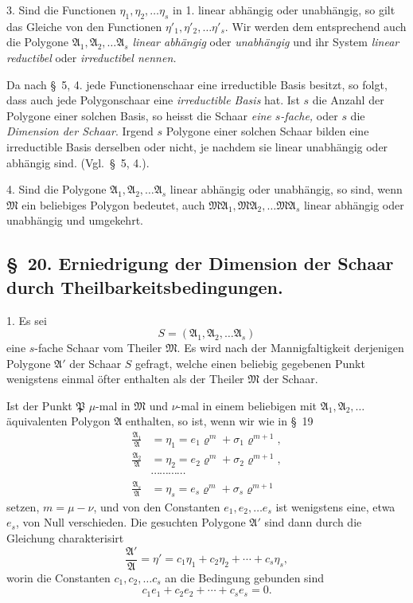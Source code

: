 \documentclass{article}
\begin{document}

3. Sind die Functionen $\eta_{1}, \eta_{2}, \ldots \eta_{s}$ in 1. linear abhängig oder unabhängig, so gilt das Gleiche von den Functionen $\eta'_{1}, \eta'_{2}, \ldots \eta'_{s}$. Wir werden dem entsprechend auch die Polygone $\mathfrak{A}_{1}, \mathfrak{A}_{2}, \ldots \mathfrak{A}_{s}$ \emph{linear abhängig} oder \emph{unabhängig} und ihr System \emph{linear reductibel} oder \emph{irreductibel nennen.}

Da nach §~5, 4. jede Functionenschaar eine irreductible Basis besitzt, so folgt, dass auch jede Polygonschaar eine \emph{irreductible Basis} hat. Ist $s$ die Anzahl der Polygone einer solchen Basis, so heisst die Schaar \emph{eine $s$-fache,} oder $s$ die \emph{Dimension der Schaar}. Irgend $s$ Polygone einer solchen Schaar bilden eine irreductible Basis derselben oder nicht, je nachdem sie linear unabhängig oder abhängig sind. (Vgl.\ §~5, 4.).

4. Sind die Polygone $\mathfrak{A}_{1}, \mathfrak{A}_{2}, \ldots \mathfrak{A}_{s}$ linear abhängig oder unabhängig, so sind, wenn $\mathfrak{M}$ ein beliebiges Polygon bedeutet, auch $\mathfrak{M}\mathfrak{A}_{1}, \mathfrak{M}\mathfrak{A}_{2}, \ldots \mathfrak{M}\mathfrak{A}_{s}$ linear abhängig oder unabhängig und umgekehrt.

\subsection*{§~20. Erniedrigung der Dimension der Schaar durch Theilbarkeitsbedingungen.}

1. Es sei
\[ S = (\mathfrak{A}_{1}, \mathfrak{A}_{2}, \ldots \mathfrak{A}_{s}) \]
eine $s$-fache Schaar vom Theiler $\mathfrak{M}$. Es wird nach der Mannigfaltigkeit derjenigen Polygone $\mathfrak{A}'$ der Schaar $S$ gefragt, welche einen beliebig gegebenen Punkt wenigstens einmal öfter enthalten als der Theiler $\mathfrak{M}$ der Schaar.

Ist der Punkt $\mathfrak{P}$ $\mu$-mal in $\mathfrak{M}$ und $\nu$-mal in einem beliebigen mit $\mathfrak{A}_{1}, \mathfrak{A}_{2}, \ldots$ äquivalenten Polygon $\mathfrak{A}$ enthalten, so ist, wenn wir wie in §~19
\[ \begin{aligned} \frac{\mathfrak{A}_{1}}{\mathfrak{A}} &= \eta_{1} = e_{1}\varrho^{m} + \sigma_{1}\varrho^{m+1}, \\ \frac{\mathfrak{A}_{2}}{\mathfrak{A}} &= \eta_{2} = e_{2}\varrho^{m} + \sigma_{2}\varrho^{m+1}, \\ &\cdots\cdots\cdots\cdots \\ \frac{\mathfrak{A}_{s}}{\mathfrak{A}} &= \eta_{s} = e_{s}\varrho^{m} + \sigma_{s}\varrho^{m+1} \end{aligned} \]
setzen, $m = \mu - \nu$, und von den Constanten $e_{1}, e_{2}, \ldots e_{s}$ ist wenigstens eine, etwa $e_{s}$, von Null verschieden. Die gesuchten Polygone $\mathfrak{A}'$ sind dann durch die Gleichung charakterisirt
\[ \frac{\mathfrak{A}'}{\mathfrak{A}} = \eta' = c_{1}\eta_{1} + c_{2}\eta_{2} + \cdots + c_{s}\eta_{s}, \]
worin die Constanten $c_{1}, c_{2}, \ldots c_{s}$ an die Bedingung gebunden sind
\[ c_{1}e_{1} + c_{2}e_{2} + \cdots + c_{s}e_{s} = 0. \]
\end{document}
